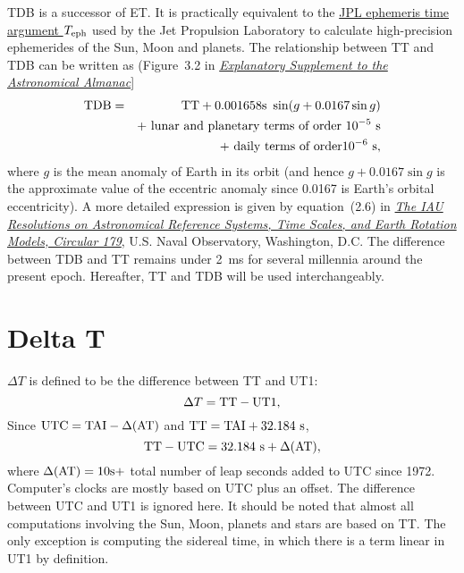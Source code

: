 \documentclass[12pt]{article}
\newcommand \beq {\begin{equation}}
\newcommand \eeq {\end{equation}}
\newcommand \beqn {\begin{eqnarray}}
\newcommand \eeqn {\end{eqnarray}}
\newcommand{\expl}{\href{http://www.uscibooks.com/urban.htm}{\it Explanatory Supplement to the Astronomical Almanac}}
\newcommand{\kaplan}{\href{https://arxiv.org/abs/astro-ph/0602086}{\it The IAU Resolutions on Astronomical Reference Systems, Time Scales, and Earth Rotation Models, Circular 179}}
\begin{document}
TDB is a successor of ET. It is practically equivalent to the 
\href{https://en.wikipedia.org/wiki/Ephemeris_time#JPL_ephemeris_time_argument_Teph}{JPL ephemeris time argument $T_{\rm eph}$} 
used by the Jet Propulsion Laboratory to calculate high-precision ephemerides of 
the Sun, Moon and planets. The relationship between TT and TDB 
can be written as (Figure~3.2 in \expl ] 
\beqn
  {\rm TDB} &=& {\rm TT} + 0.001658{\rm s}~\sin(g + 0.0167\sin g) \cr 
&& + \mbox{ lunar and planetary terms of order } 10^{-5}~{\rm s} \cr 
&& + \mbox{ daily terms of order} 10^{-6}~{\rm s} , 
\eeqn
where $g$ is the mean anomaly of Earth in its orbit (and hence $g+0.0167\sin g$ is the 
approximate value of the eccentric anomaly since 0.0167 is Earth's orbital eccentricity). 
A more detailed expression is given by equation~(2.6) in 
\kaplan, U.S. Naval Observatory, Washington, D.C. The difference 
between TDB and TT remains under 2~ms for several millennia around the 
present epoch. Hereafter, TT and TDB will be used interchangeably.

\section{Delta T}
\label{sec:DeltaT}

$\Delta T$ is defined to be the difference between TT and UT1:
\beq
  \Delta T = {\rm TT - UT1} ,
\label{def:DeltaT}
\eeq
Since ${\rm UTC = TAI} - \Delta ({\rm AT})$ and ${\rm TT = TAI + 32.184~s}$, 
\beq
  {\rm TT - UTC = 32.184~s} + \Delta ({\rm AT}) ,
\eeq
where $\Delta ({\rm AT})=10{\rm s}+$ total number of leap seconds added to UTC since 1972. 
Computer's clocks are mostly based on UTC plus an offset.
The difference between UTC and UT1 is ignored here. 
It should be noted that almost all computations involving
the Sun, Moon, planets and stars are based on TT. The only exception is
computing the sidereal time, in which there is a term linear in UT1 by
definition.
\end{document}
